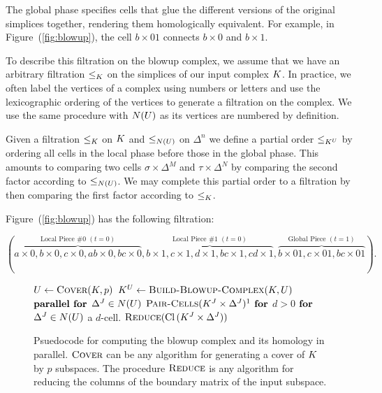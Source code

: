 The global phase specifies cells that glue the different versions of the 
original simplices together, rendering them homologically equivalent.  
For example, in Figure~(\ref{fig:blowup}), the cell 
$b \times 01$ connects $b \times 0$ and $b \times 1$.  

To describe this filtration on the blowup complex, we assume that we have an 
arbitrary filtration $\leq_{K}$ on the simplices of our input complex $K$.  In practice, 
we often label the vertices of a complex using numbers or letters and use the lexicographic 
ordering of the vertices to generate a filtration on the complex. We use the same procedure 
with $N(U)$ as its vertices are numbered by definition.

Given a filtration $\leq_{K}$ on $K$ and $\leq_{N(U)}$ on $\Delta^n$ we define a partial order $\leq_{{K^U}}$ by 
ordering all cells in the local phase before those in the global phase. This amounts to 
comparing two cells $\sigma \times \Delta^M$ and $\tau \times \Delta^N$ by  
comparing the second factor according to $\leq_{N(U)}$. We may complete this partial order to a filtration by then comparing the 
first factor according to $\leq_{K}$. 
\begin{example}
Figure~(\ref{fig:blowup}) has the following filtration: 
\begin{linenomath*}
\begin{equation*}
(\overbrace{a \times 0, b \times 0 ,c \times 0,  ab \times 0, bc \times 0}^
{\textrm{Local Piece \#0 } (t=0)},
\overbrace{b \times 1 , c \times 1, d \times 1, bc \times 1, cd \times 1}^
{\textrm{Local Piece \#1 }(t=0)},
\overbrace{b \times 01, c \times 01, bc \times 01}^
{\textrm{Global Piece } (t=1)}).
\end{equation*}
\end{linenomath*}
\end{example}
\begin{figure}
\centering
\begin{codebox}
 \li  $U \gets \textnormal{\scshape Cover}(K, p)$
 \li  $K^{U} \gets \textnormal{\scshape Build-Blowup-Complex}(K, U)$
 \li  $\textbf{parallel for}$   $\Delta^J \in N(U)$
 \li  \Do $\proc{Pair-Cells}(\K^{J} \times \Delta^{J})\footnotemark$
      \End
\li $\textbf{for}$ $d > 0$
 \li \Do $\textbf{for}$ $\Delta^J \in N(U)$ a $d$-cell.
 \li  \Do $\textnormal{\scshape Reduce}(\operatorname{Cl}{(K^{J} \times \Delta^{J})})$ 
\end{codebox}
\caption{Psuedocode for computing the blowup complex and its homology in parallel. $\textnormal{\scshape Cover}$ can be any algorithm for generating a cover of $K$ by $p$ subspaces. The procedure $\textnormal{\scshape Reduce}$ is any algorithm for reducing the columns of the boundary matrix of the input subspace.}
\label{fig:multicore-code}
\end{figure}

